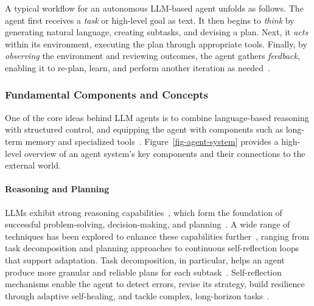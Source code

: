 \documentclass[pdflatex,sn-mathphys-num]{sn-jnl}%
\theoremstyle{thmstyleone}%
\theoremstyle{thmstyletwo}%
\theoremstyle{thmstylethree}%
\begin{document}
A typical workflow for an autonomous LLM-based agent unfolds as follows. The agent first receives a \textit{task} or high-level goal as text. It then begins to \textit{think} by generating natural language, creating subtasks, and devising a plan. Next, it \textit{acts} within its environment, executing the plan through appropriate tools. Finally, by \textit{observing} the environment and reviewing outcomes, the agent gathers \textit{feedback}, enabling it to re-plan, learn, and perform another iteration as needed~\cite{yao2023react,wang2024survey}.

\subsubsection{Fundamental Components and Concepts}

One of the core ideas behind LLM agents is to combine language-based reasoning with structured control, and equipping the agent with components such as long-term memory and specialized tools~\cite{wang2024survey,masterman2024landscape,castrillo2025fundamentals}. 
Figure~\ref{fig-agent-system} provides a high-level overview of an agent system's key components and their connections to the external world.

\paragraph{Reasoning and Planning}

LLMs exhibit strong reasoning capabilities~\cite{valmeekam2023planbench}, which form the foundation of successful problem-solving, decision-making, and planning~\cite{evans1993reasoning,xi2025rise}. A wide range of techniques has been explored to enhance these capabilities further~\cite{huang2024understanding,masterman2024landscape}, ranging from task decomposition and planning approaches to continuous self-reflection loops that support adaptation. Task decomposition, in particular, helps an agent produce more granular and reliable plans for each subtask~\cite{wei2022chain,yao2023tree,besta2024graph}. 
Self-reflection mechanisms enable the agent to detect errors, revise its strategy, build resilience through adaptive self-healing, and tackle complex, long-horizon tasks~\cite{shinn2023reflexion,yao2023react,gidey2023modeling}.
\end{document}
